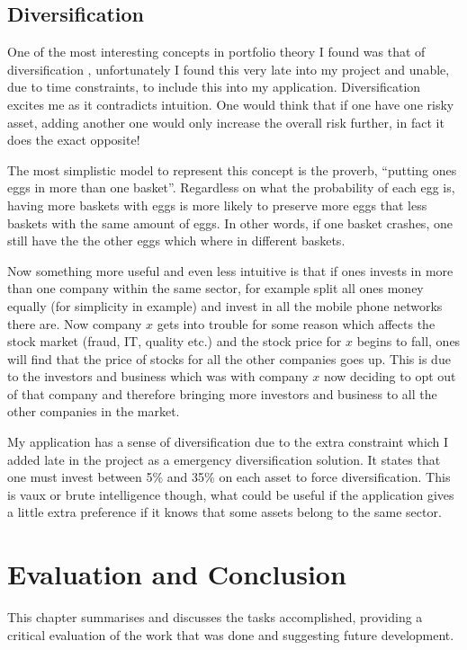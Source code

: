 \documentclass{pdfmx4020}
\begin{document}
  \section{Diversification} %
  \label{sec:diversification}
    One of the most interesting concepts in portfolio theory I found was that of diversification \cite{diversification_2}, unfortunately I found this very late into my project and unable, due to time constraints, to include this into my application. Diversification excites me as it contradicts intuition. One would think that if one have one risky asset, adding another one would only increase the overall risk further, in fact it does the exact opposite!

    The most simplistic model to represent this concept is the proverb, ``putting ones eggs in more than one basket''. Regardless on what the probability of each egg is, having more baskets with eggs is more likely to preserve more eggs that less baskets with the same amount of eggs. In other words, if one basket crashes, one still have the the other eggs which where in different baskets. 

    Now something more useful and even less intuitive is that if ones invests in more than one company within the same sector, for example split all ones money equally (for simplicity in example) and invest in all the mobile phone networks there are. Now company $x$ gets into trouble for some reason which affects the stock market (fraud, IT, quality etc.) and the stock price for $x$ begins to fall, ones will find that the price of stocks for all the other companies goes up. This is due to the investors and business which was with company $x$ now deciding to opt out of that company and therefore bringing more investors and business to all the other companies in the market. 

    My application has a sense of diversification due to the extra constraint which I added late in the project as a emergency diversification solution. It states that one must invest between 5\% and 35\% on each asset to force diversification. This is vaux or brute intelligence though, what could be useful if the application gives a little extra preference if it knows that some assets belong to the same sector. 


\chapter{Evaluation and Conclusion}
This chapter summarises and discusses the tasks accomplished, providing a critical evaluation of the work that was done and suggesting future development.
\end{document}
